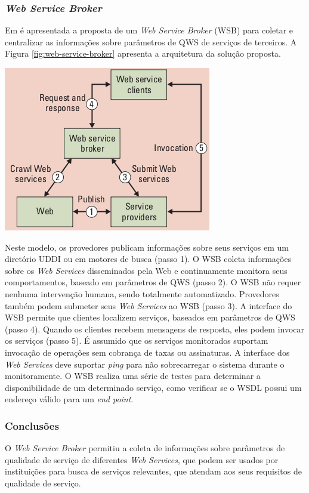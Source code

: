 \subsubsection{\textit{Web Service Broker}}

Em \cite{al2008toward} é apresentada a proposta de um \textit{Web Service Broker} (WSB) para coletar e centralizar as informações sobre parâmetros de QWS de serviços de terceiros. A Figura \ref{fig:web-service-broker} apresenta a arquitetura da solução proposta.

\begin{center}
	\includegraphics[scale=0.7]{images/web-service-broker.png}
	\label{fig:web-service-broker}
\end{center}


Neste modelo, os provedores publicam informações sobre seus serviços em um diretório UDDI ou em motores de busca (passo 1). O WSB coleta informações sobre os \textit{Web Services} disseminados pela Web e continuamente monitora seus comportamentos, baseado em parâmetros de QWS (passo 2). O WSB não requer nenhuma intervenção humana, sendo totalmente automatizado. Provedores também podem submeter seus \textit{Web Services} ao WSB (passo 3). A interface do WSB permite que clientes localizem serviços, baseados em parâmetros de QWS (passo 4). Quando os clientes recebem mensagens de resposta, eles podem invocar os serviços (passo 5). É assumido que os serviços monitorados suportam invocação de operações sem cobrança de taxas ou assinaturas. A interface dos \textit{Web Services} deve suportar \textit{ping} para não sobrecarregar o sistema durante o monitoramente. O WSB realiza uma série de testes para determinar a disponibilidade de um determinado serviço, como verificar se o WSDL possui um endereço válido para um \textit{end point}.


\subsubsection{Conclusões}

O \textit{Web Service Broker} permitiu a coleta de informações sobre parâmetros de qualidade de serviço de diferentes \textit{Web Services}, que podem ser usados por instituições para busca de serviços relevantes, que atendam aos seus requisitos de qualidade de serviço.

